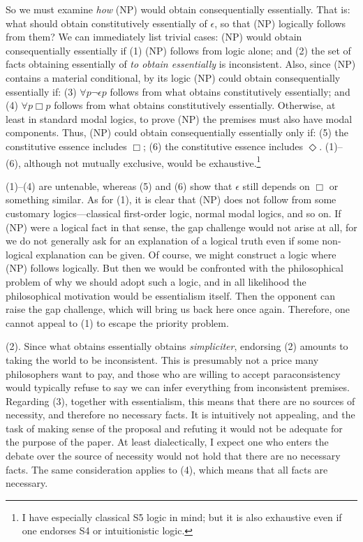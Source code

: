 \documentclass[12pt]{article}
\begin{document}
So we must examine \textit{how} (NP) would obtain consequentially essentially. That is: what should obtain constitutively essentially of $\epsilon$, so that (NP) logically follows from them? We can immediately list trivial cases: (NP) would obtain consequentially essentially if (1) (NP) follows from logic alone; and (2) the set of facts obtaining essentially of \textit{to obtain essentially} is inconsistent. Also, since (NP) contains a material conditional, by its logic (NP) could obtain consequentially essentially if: (3) $\forall p \lnot \epsilon p$ follows from what obtains constitutively essentially; and (4) $\forall p \Box p$ follows from what obtains constitutively essentially. Otherwise, at least in standard modal logics, to prove (NP) the premises must also have modal components. Thus, (NP) could obtain consequentially essentially only if: (5) the constitutive essence includes $\Box$; (6) the constitutive essence includes $\Diamond$. (1)--(6), although not mutually exclusive, would be exhaustive.\footnote{I have especially classical S5 logic in mind; but it is also exhaustive even if one endorses S4 or intuitionistic logic.} 
\par
(1)--(4) are untenable, whereas (5) and (6) show that $\epsilon$ still depends on $\Box$ or something similar. As for (1), it is clear that (NP) does not follow from some customary logics---classical first-order logic, normal modal logics, and so on. If (NP) were a logical fact in that sense, the gap challenge would not arise at all, for we do not generally ask for an explanation of a logical truth even if some non-logical explanation can be given. Of course, we might construct a logic where (NP) follows logically. But then we would be confronted with the philosophical problem of why we should adopt such a logic, and in all likelihood the philosophical motivation would be essentialism itself. Then the opponent can raise the gap challenge, which will bring us back here once again. Therefore, one cannot appeal to (1) to escape the priority problem. 
\par
(2). Since what obtains essentially obtains \textit{simpliciter}, endorsing (2) amounts to taking the world to be inconsistent. This is presumably not a price many philosophers want to pay, and those who are willing to accept paraconsistency would typically refuse to say we can infer everything from inconsistent premises. Regarding (3), together with essentialism, this means that there are no sources of necessity, and therefore no necessary facts. It is intuitively not appealing, and the task of making sense of the proposal and refuting it would not be adequate for the purpose of the paper. At least dialectically, I expect one who enters the debate over the source of necessity would not hold that there are no necessary facts. The same consideration applies to (4), which means that all facts are necessary.  
\end{document}
